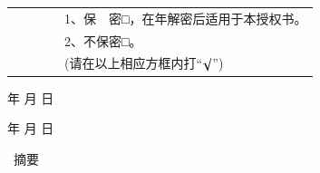 {{            \vspace{0.5cm}
            \begin{center}\hei\xiaoer{\@authorizedtitle}\end{center}\par
            \vspace{1.2\baselineskip}
            \song{}\par
            \song{}\par
            \begin{tabular}{lll}
                \qquad\qquad& \qquad\quad\qquad&\ \ \ \ 1、保　密□，在\underline{\qquad\qquad}年解密后适用于本授权书。 \\
                \qquad\qquad& \qquad\quad\qquad&\ \ \ \ 2、不保密□。                                       \\
                \qquad\qquad& \qquad\quad\qquad&\ \ \ \ (请在以上相应方框内打``$\surd$'')
            \end{tabular}
            \par
            \vspace{1\baselineskip}
            \song\xiaosi
            \@studentsign \makebox[3cm][s]{} \qquad\qquad\qquad  
            \makebox[0.5cm][s]{} 年 \makebox[0.5cm][s]{} 月 \makebox[0.5cm][s]{} 日\par
            \vspace{0.25\baselineskip}
            \@teachersign \makebox[3cm][s]{} \qquad\qquad\qquad  
            \makebox[0.5cm][s]{} 年 \makebox[0.5cm][s]{} 月 \makebox[0.5cm][s]{} 日
        }
        \clearpage

         {
            \begin{center}
                \hei\xiaoer{\@title}
            \end{center}\par
            \vspace{0.5\baselineskip}
            \begin{center}
                \hei\xiaoer\ 摘\qquad 要
            \end{center}\par
            \vspace{0.5\baselineskip}
            \song{}\@cabstract
            \vspace{\baselineskip}
            \hangindent=52.3pt\noindent
            \newline\noindent
            {\hei{} \hei\xiaosi\@ckeywords}
        }
        \clearpage
        
}
